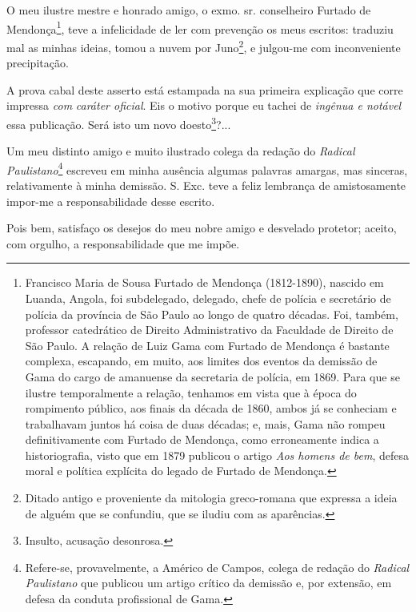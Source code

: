 \asterisc{}

O meu ilustre mestre e honrado amigo, o exmo. sr. conselheiro Furtado de
Mendonça\footnote{Francisco Maria de Sousa Furtado de Mendonça
  (1812-1890), nascido em Luanda, Angola, foi subdelegado, delegado,
  chefe de polícia e secretário de polícia da província de São Paulo ao
  longo de quatro décadas. Foi, também, professor catedrático de Direito
  Administrativo da Faculdade de Direito de São Paulo. A relação de Luiz
  Gama com Furtado de Mendonça é bastante complexa, escapando, em muito,
  aos limites dos eventos da demissão de Gama do cargo de amanuense da
  secretaria de polícia, em 1869. Para que se ilustre temporalmente a
  relação, tenhamos em vista que à época do rompimento público, aos
  finais da década de 1860, ambos já se conheciam e trabalhavam juntos
  há coisa de duas décadas; e, mais, Gama não rompeu definitivamente com
  Furtado de Mendonça, como erroneamente indica a historiografia, visto
  que em 1879 publicou o artigo \emph{Aos homens de bem}, defesa moral e
  política explícita do legado de Furtado de Mendonça.}, teve a
infelicidade de ler com prevenção os meus escritos: traduziu mal as
minhas ideias, tomou a nuvem por Juno\footnote{Ditado antigo e
  proveniente da mitologia greco-romana que expressa a ideia de alguém
  que se confundiu, que se iludiu com as aparências.}, e julgou-me com
inconveniente precipitação.

A prova cabal deste asserto está estampada na sua primeira explicação
que corre impressa \emph{com} \emph{caráter oficial}. Eis o motivo
porque eu tachei de \emph{ingênua e notável} essa publicação. Será isto
um novo doesto\footnote{Insulto, acusação desonrosa.}?...

Um meu distinto amigo e muito ilustrado colega da redação do
\emph{Radical Paulistano}\footnote{Refere-se, provavelmente, a Américo
  de Campos, colega de redação do \emph{Radical Paulistano} que publicou
  um artigo crítico da demissão e, por extensão, em defesa da conduta
  profissional de Gama.} escreveu em minha ausência algumas palavras
amargas, mas sinceras, relativamente à minha demissão. S. Exc. teve a
feliz lembrança de amistosamente impor-me a responsabilidade desse
escrito.

Pois bem, satisfaço os desejos do meu nobre amigo e desvelado protetor;
aceito, com orgulho, a responsabilidade que me impõe.

